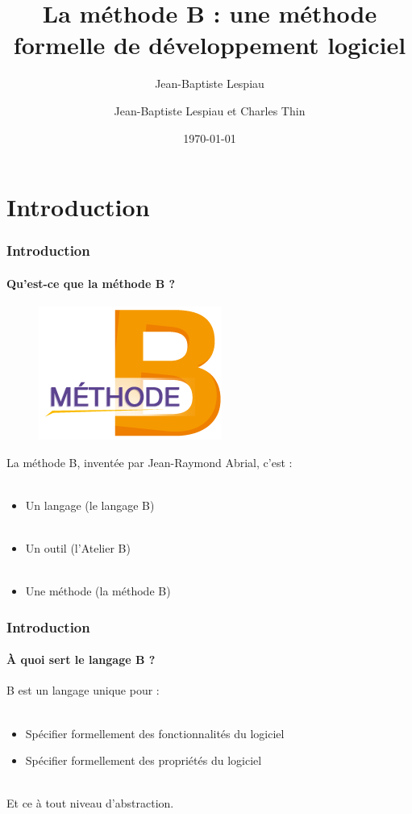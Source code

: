 \documentclass[11pt,a4paper,xcolor=table, handout]{beamer} %
\author[]{Jean-Baptiste Lespiau}
\author{Jean-Baptiste Lespiau et Charles Thin}
\title{La méthode B : une méthode formelle de développement logiciel}
\date\today
\begin{document}
\frame{\titlepage}

\section*{Introduction}

\begin{frame}
\frametitle{Introduction}
\framesubtitle{Qu'est-ce que la méthode B ?}
\begin{figure}[h]
\includegraphics[scale=0.2]{ressources/logo1.png}
\end{figure}
La méthode B, inventée par Jean-Raymond Abrial, c'est :\\~\\
\begin{itemize}
\item Un langage (le langage B)\\~\\
\pause
\item Un outil (l'Atelier B)\\~\\
\pause
\item Une méthode (la méthode B)
\end{itemize}
\end{frame}

\begin{frame}
\frametitle{Introduction}
\framesubtitle{À quoi sert le langage B ?}
B est un langage unique pour :\\~\\
\pause
\begin{itemize}
\item Spécifier formellement des fonctionnalités du logiciel
\pause
\item Spécifier formellement des propriétés du logiciel
\pause
\end{itemize}
~\\
Et ce à tout niveau d'abstraction.
\end{frame}
\end{document}
